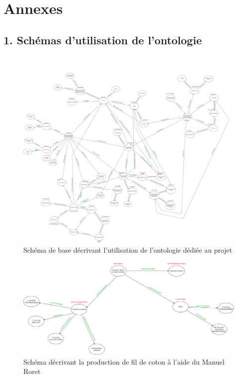 \chapter*{Annexes}

\section*{1. Schémas d'utilisation de l'ontologie}\label{annexe1}
\begin{figure} [H]
    \centering
    \includegraphics[width=1\textwidth]{assets/annexes/schema_base_ontologie_TTM.jpg}
    \caption{Schéma de base décrivant l'utilisation de l'ontologie dédiée au projet}
    \label{fig:schemaBaseTTM}
\end{figure}

\begin{figure} [H]
    \centering
    \includegraphics[width=1\textwidth]{assets/annexes/schema_manuel_roret.png}
    \caption{Schéma décrivant la production de fil de coton à l'aide du Manuel Roret}
    \label{fig:schemaRoretTTM}
\end{figure}

